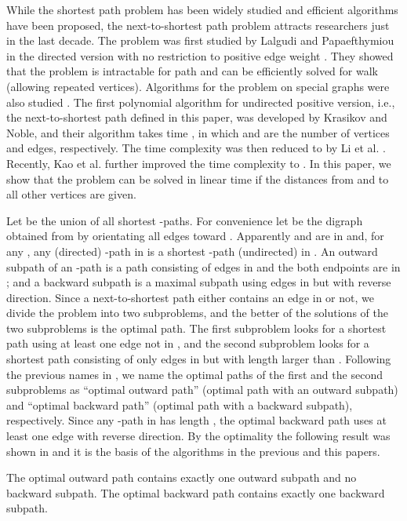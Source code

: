 While the shortest path problem has been widely studied and efficient algorithms have been proposed, the next-to-shortest path problem attracts researchers just in the last decade.
The problem was first studied by Lalgudi and Papaefthymiou in the directed version with no restriction to positive edge weight \cite{lal97}. They showed that the problem is intractable for path and can be efficiently solved for walk (allowing repeated vertices).
Algorithms for the problem on special graphs were also studied \cite{bar07,mod06}.
The first polynomial algorithm for undirected positive version, i.e., the next-to-shortest path defined in this paper,
was developed by Krasikov and Noble, and their algorithm takes  time \cite{kra04}, in which  and  are the number of vertices and edges, respectively.
The time complexity was then reduced to  by Li et al. \cite{li06}.
Recently, Kao et al. further improved the time complexity to  \cite{kao10}.
In this paper, we show that the problem can be solved in linear time if the distances from  and  to all other vertices are given.

Let  be the union of all shortest -paths. 
For convenience let  be the digraph obtained from  by orientating all edges toward .
Apparently  and  are in  and, for any , any (directed) -path in  is a shortest -path (undirected) in .
An outward subpath of an -path is a path consisting of edges in  and the both endpoints are in ; and a backward subpath is a maximal subpath using edges in  but with reverse direction.
Since a next-to-shortest path either contains an edge in  or not, we divide the problem into two subproblems, and the better of the solutions of the two subproblems is the optimal path.
The first subproblem looks for a shortest path using at least one edge not in , and the second subproblem looks for a shortest path consisting of only edges in  but with length larger than . Following the previous names in \cite{kao10}, we name the optimal paths of the first and the second subproblems as ``optimal outward path'' (optimal path with an outward subpath) and ``optimal backward path'' (optimal path with a backward subpath), respectively. 
Since any -path in  has length , the optimal backward path uses at least one edge with reverse direction. By the optimality the following result was shown in \cite{kao10}
and it is the basis of the algorithms in the previous and this papers.
\begin{lemma}\label{c1}
The optimal outward path contains exactly one outward subpath and no backward subpath. The optimal backward path contains exactly one backward subpath.
\end{lemma}


